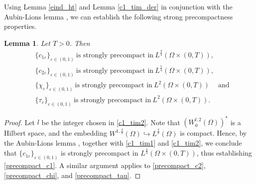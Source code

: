 \documentclass[a4paper,10pt]{article}
\newtheorem{Lemma}[Theorem]{Lemma}
\theoremstyle{definition}
\begin{document}

\noindent
Using Lemma \ref{eind_ht} and Lemma \ref{c1_tim_der} in conjunction with the  Aubin-Lions lemma \cite[Chapter 3]{temam2001navier}, we can establish the following strong precompactness properties.

\begin{Lemma}
\label{precompactness_all}
Let $T > 0$. Then
\begin{align}
  \label{precompact_c1}    & \{c_{1\varepsilon}\}_{\varepsilon \in (0,1)} ~\text{is strongly precompact in}~ L^{\frac{4}{3}}(\Omega \times (0, T)),  \\[5pt]
  \label{precompact_c2}    & \{c_{2\varepsilon}\}_{\varepsilon \in (0,1)} ~\text{is strongly precompact in}~ L^{\frac{5}{4}}(\Omega \times (0, T)),  \\[5pt]
  \label{precompact_chi}     & \{\chi_{\varepsilon}\}_{\varepsilon \in (0,1)}   ~\text{is strongly precompact in}~ L^{2}(\Omega \times (0, T))   \quad ~\text{and}       \\[5pt]
  \label{precompact_tau}   & \{\tau_{\varepsilon}\}_{\varepsilon \in (0,1)}   ~\text{is strongly precompact in}~ L^{2}(\Omega \times (0, T)).
\end{align}
\end{Lemma}

\begin{proof}
  Let $l$ be the integer chosen in \eqref{c1_tim2}. Note that $(W_0^{l, 2}(\Omega))^\ast$ is a Hilbert space, and the embedding $W^{1, \frac{4}{3}}(\Omega) \hookrightarrow L^{\frac{4}{3}}(\Omega)$ is compact. Hence, by the Aubin-Lions lemma \cite[Theorem 3.2.3 and Remark 3.2.1]{temam2001navier}, together with \eqref{c1_tim1} and \eqref{c1_tim2}, we conclude that $\{c_{1\varepsilon}\}_{\varepsilon \in (0,1)}$ is strongly precompact in $L^{\frac{4}{3}}(\Omega \times (0, T))$, thus establishing \eqref{precompact_c1}. A similar argument applies to \eqref{precompact_c2}, \eqref{precompact_chi}, and \eqref{precompact_tau}.
\end{proof}



\end{document}
